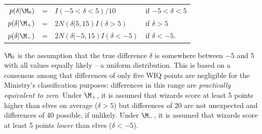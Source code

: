 \begin{center}\begin{tabular}{rrll}
$p(\delta|\M_0)$ &=& $I(-5 < \delta < 5)/10$     &{ if }$-5 < \delta < 5$\\
$p(\delta|\M_+)$ &=& $2N(\delta|5,15)I(\delta>5)$ &{ if }$\delta > 5$\\
$p(\delta|\M_-)$ &=& $2N(\delta|-5,15)I(\delta< -5)$ &{ if }$\delta < -5$.
\end{tabular}\end{center}
$\M_0$ is the assumption that the true difference $\delta$ is somewhere between $-5$ and $5$ with all values equally likely -- a uniform distribution. This is based on a consensus among \wishes{} that differences of only five WIQ points are negligible for the Ministry's classification purposes: differences in this range are \emph{practically equivalent to zero}. Under $\M_+$, it is assumed that wizards score at least 5 points higher than elves on average ($\delta > 5$) but differences of 20 are not unexpected and differences of 40 possible, if unlikely. Under $\M_-$, it is assumed that wizards score at least 5 points \emph{lower} than elves ($\delta < -5$). 


